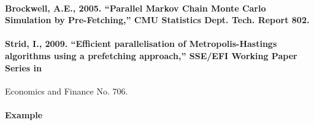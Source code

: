  \paragraph{Brockwell, A.E., 2005. ``Parallel Markov Chain Monte Carlo
 Simulation by Pre-Fetching,'' CMU Statistics Dept. Tech. Report 802.}
 
 \paragraph{Strid, I., 2009. ``Efficient parallelisation of
 Metropolis-Hastings algorithms using a prefetching approach,'' SSE/EFI
 Working Paper Series in}
 
 Economics and Finance No. 706.
 
 \paragraph{Example}


